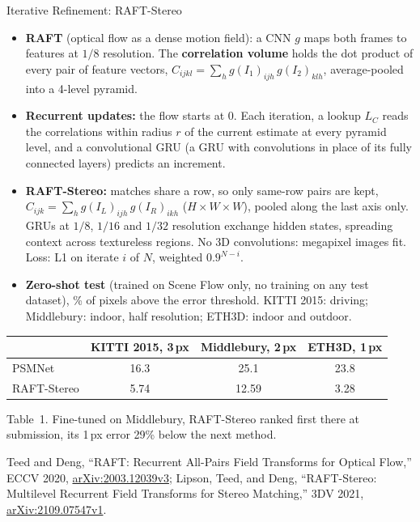 \begin{frame}{Iterative Refinement: RAFT-Stereo}
  \begin{itemize}\scriptsize\itemsep0.1em
    \item \textbf{RAFT} (optical flow as a dense motion field): a CNN $g$ maps both frames to features at $1/8$ resolution. The \textbf{correlation volume} holds the dot product of every pair of feature vectors, $C_{ijkl} = \sum_h g(I_1)_{ijh}\, g(I_2)_{klh}$, average-pooled into a 4-level pyramid.
    \item \textbf{Recurrent updates:} the flow starts at $0$. Each iteration, a lookup $L_C$ reads the correlations within radius $r$ of the current estimate at every pyramid level, and a convolutional GRU (a GRU with convolutions in place of its fully connected layers) predicts an increment.
    \item \textbf{RAFT-Stereo:} matches share a row, so only same-row pairs are kept, $C_{ijk} = \sum_h g(I_L)_{ijh}\, g(I_R)_{ikh}$ ($H{\times}W{\times}W$), pooled along the last axis only. GRUs at $1/8$, $1/16$ and $1/32$ resolution exchange hidden states, spreading context across textureless regions. No 3D convolutions: megapixel images fit. Loss: L1 on iterate $i$ of $N$, weighted $0.9^{N-i}$.
    \item \textbf{Zero-shot test} (trained on Scene Flow only, no training on any test dataset), \% of pixels above the error threshold. KITTI 2015: driving; Middlebury: indoor, half resolution; ETH3D: indoor and outdoor.
  \end{itemize}
  \vspace{0.1em}
  {\centering\scriptsize
  \begin{tabular}{l c c c}
    \toprule
    & \textbf{KITTI 2015, 3\,px} & \textbf{Middlebury, 2\,px} & \textbf{ETH3D, 1\,px} \\
    \midrule
    PSMNet & 16.3 & 25.1 & 23.8 \\
    RAFT-Stereo & 5.74 & 12.59 & 3.28 \\
    \bottomrule
  \end{tabular}\par}
  \vspace{0.2em}
  {\scriptsize Table~1. Fine-tuned on Middlebury, RAFT-Stereo ranked first there at submission, its 1\,px error 29\% below the next method.\par}
  \vspace{0.2em}
  {\scriptsize Teed and Deng, ``RAFT: Recurrent All-Pairs Field Transforms for Optical Flow,'' ECCV 2020, \href{https://arxiv.org/abs/2003.12039v3}{arXiv:2003.12039v3}; Lipson, Teed, and Deng, ``RAFT-Stereo: Multilevel Recurrent Field Transforms for Stereo Matching,'' 3DV 2021, \href{https://arxiv.org/abs/2109.07547v1}{arXiv:2109.07547v1}.\par}
\end{frame}

